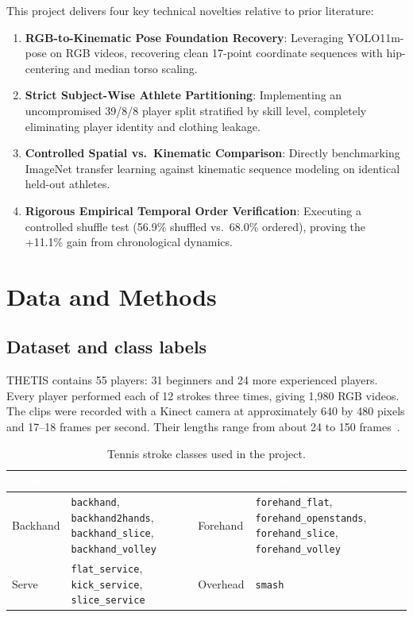 \documentclass[12pt,a4paper]{article}
\begin{document}
This project delivers four key technical novelties relative to prior literature:
\begin{enumerate}[topsep=0pt,itemsep=0pt,parsep=0pt,partopsep=0pt]
\item \textbf{RGB-to-Kinematic Pose Foundation Recovery}: Leveraging YOLO11m-pose on RGB videos, recovering clean 17-point coordinate sequences with hip-centering and median torso scaling.
\item \textbf{Strict Subject-Wise Athlete Partitioning}: Implementing an uncompromised 39/8/8 player split stratified by skill level, completely eliminating player identity and clothing leakage.
\item \textbf{Controlled Spatial vs.\ Kinematic Comparison}: Directly benchmarking ImageNet transfer learning against kinematic sequence modeling on identical held-out athletes.
\item \textbf{Rigorous Empirical Temporal Order Verification}: Executing a controlled shuffle test (56.9\% shuffled vs.\ 68.0\% ordered), proving the +11.1\% gain from chronological dynamics.
\end{enumerate}
\clearpage
\section{Data and Methods}
\subsection{Dataset and class labels}
THETIS contains 55 players: 31 beginners and 24 more experienced players. Every player performed each of 12 strokes three times, giving 1,980 RGB videos. The clips were recorded with a Kinect camera at approximately 640 by 480 pixels and 17--18 frames per second. Their lengths range from about 24 to 150 frames~\cite{gourgari2013thetis}.

\vspace{0.6em}
\begin{table}[H]
\centering
\small
\setlength{\tabcolsep}{8pt}
\renewcommand{\arraystretch}{1.25}
\caption{Tennis stroke classes used in the project.}
\label{tab:stroke-classes}
\begin{tabularx}{\textwidth}{lY lY}
\toprule
{}
\textcolor{white}{\textbf{Group}} & \textcolor{white}{\textbf{Classes}} & \textcolor{white}{\textbf{Group}} & \textcolor{white}{\textbf{Classes}} \\
\midrule
{}
Backhand & \texttt{backhand}, \texttt{backhand2hands}, \texttt{backhand\_\allowbreak slice}, \texttt{backhand\_\allowbreak volley} & Forehand & \texttt{forehand\_flat}, \texttt{forehand\_\allowbreak openstands}, \texttt{forehand\_slice}, \texttt{forehand\_\allowbreak volley} \\
Serve & \texttt{flat\_\allowbreak service}, \texttt{kick\_\allowbreak service}, \texttt{slice\_\allowbreak service} & Overhead & \texttt{smash} \\
\bottomrule
\end{tabularx}
\end{table}
\end{document}
